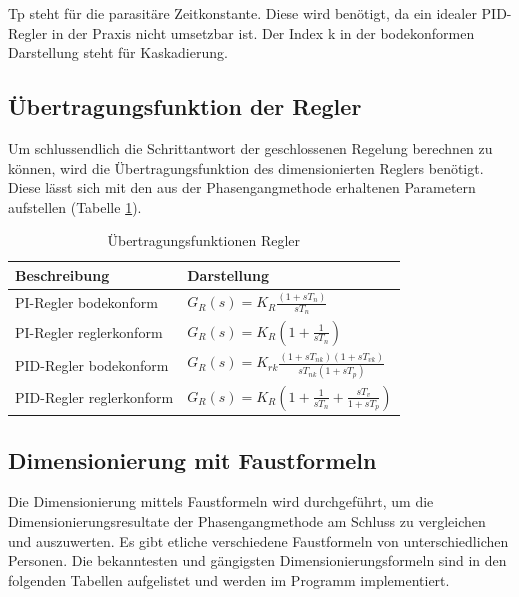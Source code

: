 Tp steht für die parasitäre Zeitkonstante. Diese wird benötigt, da ein idealer PID-Regler in der Praxis nicht umsetzbar ist. Der Index k in der bodekonformen Darstellung steht für Kaskadierung.

\subsection{Übertragungsfunktion der Regler}
Um schlussendlich die Schrittantwort der geschlossenen Regelung berechnen zu können, wird die Übertragungsfunktion des dimensionierten Reglers benötigt. Diese lässt sich mit den aus der Phasengangmethode erhaltenen Parametern aufstellen (Tabelle \ref{ufunkregler}).\newline
\begin{table}
\centering
\renewcommand*{\arraystretch}{1.7}
\begin{tabular}{|l|l|}
\hline 
\textbf{Beschreibung} & \textbf{Darstellung} \\ 
\hline
PI-Regler bodekonform & $G_R(s)=K_R\frac{(1+sT_n)}{sT_n}$ \\ 
\hline 
PI-Regler reglerkonform & $G_R(s)=K_R\left(1+\frac{1}{sT_n}\right)$ \\ 
\hline 
PID-Regler bodekonform & $G_R(s)=K_{rk}\frac{(1+sT_{nk})(1+sT_{vk})}{sT_{nk}(1+sT_p)}$ \\ 
\hline 
PID-Regler reglerkonform & $G_R(s)=K_R\left(1+\frac{1}{sT_n}+\frac{sT_v}{1+sT_p}\right)$ \\ 
\hline 
\end{tabular} 
\renewcommand*{\arraystretch}{1}
\caption{Übertragungsfunktionen Regler \cite{zellwegerregel}}
\label{ufunkregler}
\end{table}

\newpage
\subsection{Dimensionierung mit Faustformeln}
Die Dimensionierung mittels Faustformeln wird durchgeführt, um die Dimensionierungsresultate der Phasengangmethode am Schluss zu vergleichen und auszuwerten. Es gibt etliche verschiedene Faustformeln von unterschiedlichen Personen. Die bekanntesten und gängigsten Dimensionierungsformeln sind in den folgenden Tabellen aufgelistet und werden im Programm implementiert.\\

